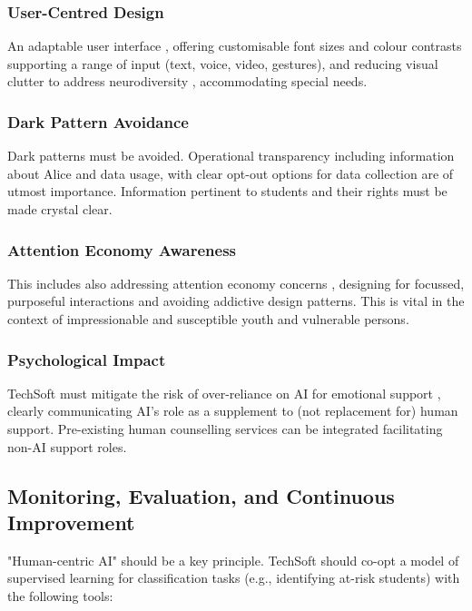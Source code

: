 \documentclass[14pt,a4paper]{article}
\begin{document}
\begin{multicols}{2}
\subsubsection{User-Centred Design}
An adaptable user interface \textit{\parencite[pp. 20-50]{HarperYesilada2024}}, offering customisable font sizes and colour contrasts supporting a range of input (text, voice, video, gestures), and reducing visual clutter to address neurodiversity \textit{\parencite[pp. 30-60]{Armstrong2024}}, accommodating special needs.

\subsubsection{Dark Pattern Avoidance}
Dark patterns \textit{\parencite{Brignull2024}} must be avoided.
Operational transparency including information about Alice and data usage, with clear opt-out options for data collection are of utmost importance.
Information pertinent to students and their rights must be made crystal clear.

\subsubsection{Attention Economy Awareness}
This includes also addressing attention economy concerns \textit{\parencite[pp. 10-30]{Williams2024}}, designing for focussed, purposeful interactions and avoiding addictive design patterns.
This is vital in the context of impressionable and susceptible youth and vulnerable persons.

\subsubsection{Psychological Impact}
TechSoft must mitigate the risk of over-reliance on AI for emotional support \textit{\parencite[p. 746]{Miner2022}}, clearly communicating AI's role as a supplement to (not replacement for) human support.
Pre-existing human counselling services can be integrated facilitating non-AI support roles.

\subsection{Monitoring, Evaluation, and Continuous Improvement}
 "Human-centric AI" should be a key principle.
 TechSoft should co-opt a model of supervised learning for classification tasks (e.g., identifying at-risk students) with the following tools:


\end{multicols}
\end{document}
